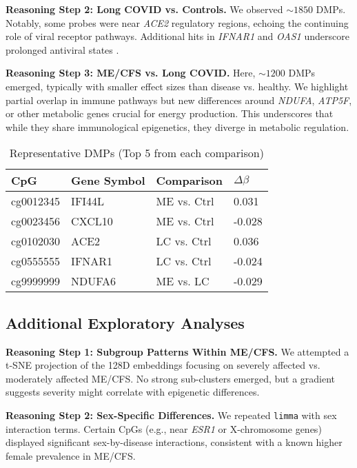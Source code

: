 \documentclass[journal]{IEEEtran}
\begin{document}
\textbf{Reasoning Step 2: Long COVID vs. Controls.}
We observed $\sim1850$ DMPs. Notably, some probes were near \textit{ACE2} regulatory regions, echoing the continuing role of viral receptor pathways. Additional hits in \textit{IFNAR1} and \textit{OAS1} underscore prolonged antiviral states \cite{Davis2023longCOVID}.

\textbf{Reasoning Step 3: ME/CFS vs. Long COVID.}
Here, $\sim1200$ DMPs emerged, typically with smaller effect sizes than disease vs. healthy. We highlight partial overlap in immune pathways but new differences around \textit{NDUFA}, \textit{ATP5F}, or other metabolic genes crucial for energy production. This underscores that while they share immunological epigenetics, they diverge in metabolic regulation.

\begin{table}[H]
\centering
\caption{Representative DMPs (Top 5 from each comparison)}
\begin{tabular}{@{}llll@{}}
\toprule
\textbf{CpG} & \textbf{Gene Symbol} & \textbf{Comparison} & \textbf{$\Delta\beta$}\\
\midrule
cg0012345 & IFI44L & ME vs. Ctrl & 0.031 \\
cg0023456 & CXCL10 & ME vs. Ctrl & -0.028 \\
cg0102030 & ACE2 & LC vs. Ctrl & 0.036 \\
cg0555555 & IFNAR1 & LC vs. Ctrl & -0.024 \\
cg9999999 & NDUFA6 & ME vs. LC & -0.029 \\
\bottomrule
\end{tabular}
\end{table}

\subsection{Additional Exploratory Analyses}
\textbf{Reasoning Step 1: Subgroup Patterns Within ME/CFS.}
We attempted a t-SNE projection of the 128D embeddings focusing on severely affected vs. moderately affected ME/CFS. No strong sub-clusters emerged, but a gradient suggests severity might correlate with epigenetic differences.

\textbf{Reasoning Step 2: Sex-Specific Differences.}
We repeated \texttt{limma} with sex interaction terms. Certain CpGs (e.g., near \textit{ESR1} or X-chromosome genes) displayed significant sex-by-disease interactions, consistent with a known higher female prevalence in ME/CFS.

\end{document}
